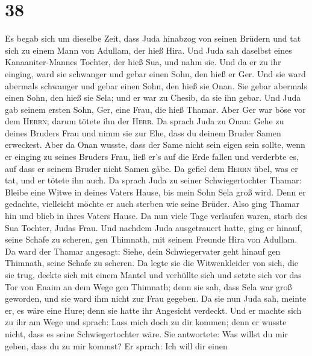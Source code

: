 \hypertarget{section-37}{%
\section{38}\label{section-37}}

 Es begab sich um dieselbe Zeit, dass Juda hinabzog von
seinen Brüdern und tat sich zu einem Mann von Adullam, der hieß Hira.
 Und Juda sah daselbst eines Kanaaniter-Mannes Tochter,
der hieß Sua, und nahm sie. Und da er zu ihr einging, 
ward sie schwanger und gebar einen Sohn, den hieß er Ger. 
Und sie ward abermals schwanger und gebar einen Sohn, den hieß sie Onan.
 Sie gebar abermals einen Sohn, den hieß sie Sela; und er
war zu Chesib, da sie ihn gebar.  Und Juda gab seinem
ersten Sohn, Ger, eine Frau, die hieß Thamar.  Aber Ger
war böse vor dem \textsc{Herrn}; darum tötete ihn der \textsc{Herr}.
 Da sprach Juda zu Onan: Gehe zu deines Bruders Frau und
nimm sie zur Ehe, dass du deinem Bruder Samen erweckest. 
Aber da Onan wusste, dass der Same nicht sein eigen sein sollte, wenn er
einging zu seines Bruders Frau, ließ er's auf die Erde fallen und
verderbte es, auf dass er seinem Bruder nicht Samen gäbe.
 Da gefiel dem \textsc{Herrn} übel, was er tat, und er
tötete ihn auch.  Da sprach Juda zu seiner
Schwiegertochter Thamar: Bleibe eine Witwe in deines Vaters Hause, bis
mein Sohn Sela groß wird. Denn er gedachte, vielleicht möchte er auch
sterben wie seine Brüder. Also ging Thamar hin und blieb in ihres Vaters
Hause.  Da nun viele Tage verlaufen waren, starb des Sua
Tochter, Judas Frau. Und nachdem Juda ausgetrauert hatte, ging er
hinauf, seine Schafe zu scheren, gen Thimnath, mit seinem Freunde Hira
von Adullam.  Da ward der Thamar angesagt: Siehe, dein
Schwiegervater geht hinauf gen Thimnath, seine Schafe zu scheren.
 Da legte sie die Witwenkleider von sich, die sie trug,
deckte sich mit einem Mantel und verhüllte sich und setzte sich vor das
Tor von Enaim an dem Wege gen Thimnath; denn sie sah, dass Sela war groß
geworden, und sie ward ihm nicht zur Frau gegeben.  Da
sie nun Juda sah, meinte er, es wäre eine Hure; denn sie hatte ihr
Angesicht verdeckt.  Und er machte sich zu ihr am Wege
und sprach: Lass mich doch zu dir kommen; denn er wusste nicht, dass es
seine Schwiegertochter wäre. Sie antwortete: Was willst du mir geben,
dass du zu mir kommst?  Er sprach: Ich will dir einen
